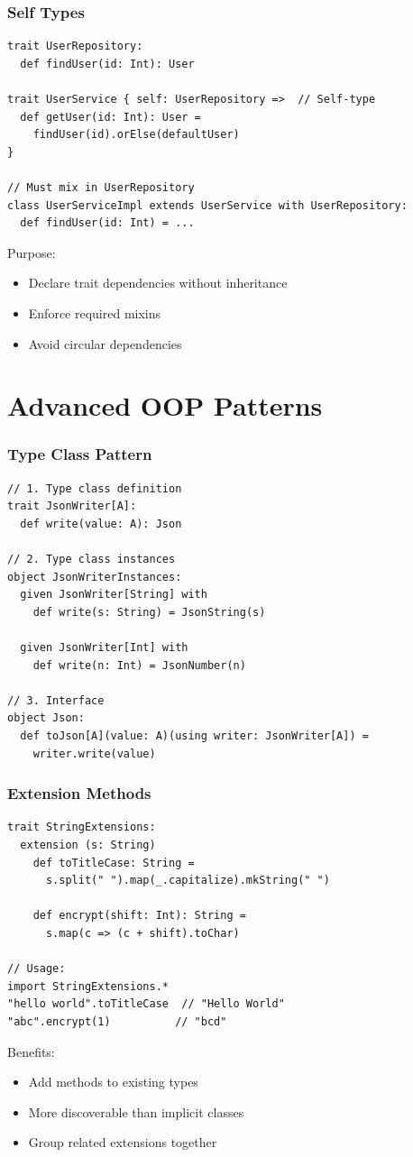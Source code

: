 \documentclass{beamer}
\begin{document}
\begin{frame}[fragile]
\frametitle{Self Types}
\begin{lstlisting}[style=scala]
trait UserRepository:
  def findUser(id: Int): User

trait UserService { self: UserRepository =>  // Self-type
  def getUser(id: Int): User = 
    findUser(id).orElse(defaultUser)
}

// Must mix in UserRepository
class UserServiceImpl extends UserService with UserRepository:
  def findUser(id: Int) = ...
\end{lstlisting}

Purpose:
\begin{itemize}
\item Declare trait dependencies without inheritance
\item Enforce required mixins
\item Avoid circular dependencies
\end{itemize}
\end{frame}

\section{Advanced OOP Patterns}
\begin{frame}[fragile]
\frametitle{Type Class Pattern}
\begin{lstlisting}[style=scala]
// 1. Type class definition
trait JsonWriter[A]:
  def write(value: A): Json

// 2. Type class instances
object JsonWriterInstances:
  given JsonWriter[String] with
    def write(s: String) = JsonString(s)
    
  given JsonWriter[Int] with
    def write(n: Int) = JsonNumber(n)

// 3. Interface
object Json:
  def toJson[A](value: A)(using writer: JsonWriter[A]) = 
    writer.write(value)
\end{lstlisting}
\end{frame}

\begin{frame}[fragile]
\frametitle{Extension Methods}
\begin{lstlisting}[style=scala]
trait StringExtensions:
  extension (s: String)
    def toTitleCase: String = 
      s.split(" ").map(_.capitalize).mkString(" ")
      
    def encrypt(shift: Int): String = 
      s.map(c => (c + shift).toChar)

// Usage:
import StringExtensions.*
"hello world".toTitleCase  // "Hello World"
"abc".encrypt(1)          // "bcd"
\end{lstlisting}

Benefits:
\begin{itemize}
\item Add methods to existing types
\item More discoverable than implicit classes
\item Group related extensions together
\end{itemize}
\end{frame}
\end{document}
